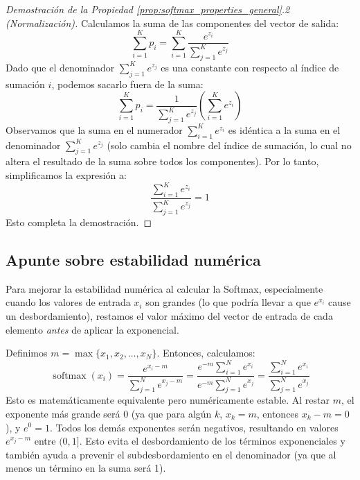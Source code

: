 \begin{proof}[Demostración de la Propiedad \ref{prop:softmax_properties_general}.2 (Normalización)]
Calculamos la suma de las componentes del vector de salida:
\[ \sum_{i=1}^K p_i = \sum_{i=1}^K \frac{e^{z_i}}{\sum_{j=1}^K e^{z_j}} \]
Dado que el denominador $\sum_{j=1}^K e^{z_j}$ es una constante con respecto al índice de sumación $i$, podemos sacarlo fuera de la suma:
\[ \sum_{i=1}^K p_i = \frac{1}{\sum_{j=1}^K e^{z_j}} \left( \sum_{i=1}^K e^{z_i} \right) \]
Observamos que la suma en el numerador $\sum_{i=1}^K e^{z_i}$ es idéntica a la suma en el denominador $\sum_{j=1}^K e^{z_j}$ (solo cambia el nombre del índice de sumación, lo cual no altera el resultado de la suma sobre todos los componentes). Por lo tanto, simplificamos la expresión a:
\[ \frac{\sum_{i=1}^K e^{z_i}}{\sum_{j=1}^K e^{z_j}} = 1 \]
Esto completa la demostración.
\end{proof}

\subsection{Apunte sobre estabilidad numérica}
Para mejorar la estabilidad numérica al calcular la Softmax, especialmente cuando los valores de entrada $x_i$ son grandes (lo que podría llevar a que $e^{x_i}$ cause un desbordamiento), restamos el valor máximo del vector de entrada de cada elemento \textit{antes} de aplicar la exponencial.

Definimos $m = \max \{x_1, x_2, \dots, x_N \}$.
Entonces, calculamos:
\[ \operatorname{softmax}(x_i) =
\frac{e^{x_i-m}}{\sum_{j=1}^{N} e^{x_j-m}} = \frac{e^{-m}\sum_{i=1}^N e^{x_i}}{e^{-m}\sum_{j=1}^{N} e^{x_j}} = \frac{\sum_{i=1}^N e^{x_i}}{\sum_{j=1}^{N} e^{x_j}}
\]
Esto es matemáticamente equivalente pero numéricamente estable.
Al restar $m$, el exponente más grande será $0$ (ya que para algún $k$, $x_k = m$, entonces $x_k - m = 0$), y $e^0 = 1$. Todos los demás exponentes serán negativos, resultando en valores $e^{x_j-m}$ entre $(0, 1]$. Esto evita el desbordamiento de los términos exponenciales y también ayuda a prevenir el subdesbordamiento en el denominador (ya que al menos un término en la suma será 1).

